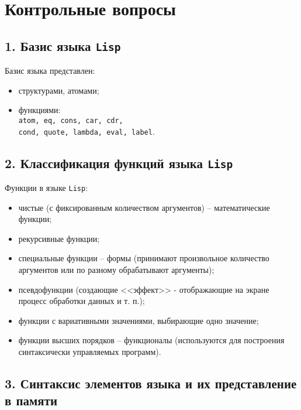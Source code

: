 \section*{Контрольные вопросы}

\subsection*{1. Базис языка {\texttt{Lisp}}}

Базис языка представлен:
\begin{itemize}
	\item структурами, атомами;
	\item функциями:\\
	{\texttt{atom, eq, cons, car, cdr,}}\\
	{\texttt{cond, quote, lambda, eval, label}}.
\end{itemize}

\subsection*{2. Классификация функций языка {\texttt{Lisp}}}

Функции в языке {\texttt{Lisp}}:
\begin{itemize}
	\item чистые (с фиксированным количеством аргументов) -- математические функции;
	\item рекурсивные функции;
	\item специальные функции -- формы (принимают произвольное количество аргументов или по разному обрабатывают аргументы);
	\item псевдофункции (создающие <<эффект>> - отображающие на экране процесс обработки данных и т. п.);
	\item функции с вариативными значениями, выбирающие одно значение;
	\item функции высших порядков -- функционалы (используются для построения синтаксически управляемых программ).
\end{itemize}

\subsection*{3. Синтаксис элементов языка и их представление в памяти}

